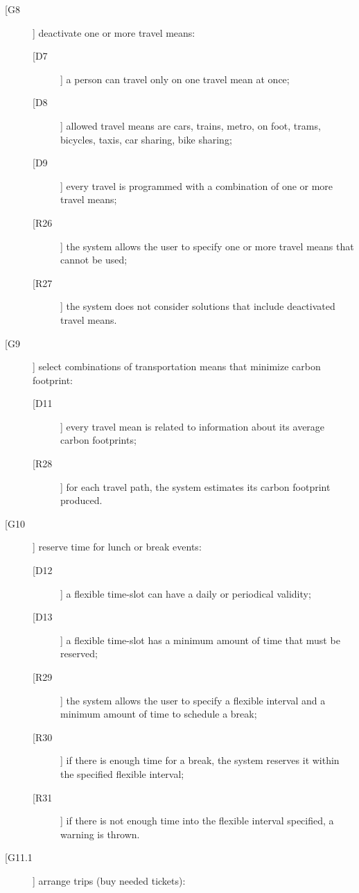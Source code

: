 \begin{description}
\begin{description}
	\end{description}
\item[[G8]] deactivate one or more travel means:
	\begin{description}
	\item[[D7]] a person can travel only on one travel mean at once; 
	\item[[D8]] allowed travel means are cars, trains, metro, on foot, trams, bicycles, taxis, car sharing, bike sharing;	
	\item[[D9]] every travel is programmed with a combination of one or more travel means;
	\newline
	\item[[R26]] the system allows the user to specify one or more travel means that cannot be used;
	\item[[R27]] the system does not consider solutions that include deactivated travel means.
	\end{description}
\item[[G9]] select combinations of transportation means that minimize carbon footprint:
	\begin{description}
	\item[[D11]] every travel mean is related to information about its average carbon footprints;
	\newline
	\item[[R28]] for each travel path, the system estimates its carbon footprint produced.
	\end{description}
\item[[G10]] reserve time for lunch or break events:
	\begin{description}
	\item[[D12]] a flexible time-slot can have a daily or periodical validity;
	\item[[D13]] a flexible time-slot has a minimum amount of time that must be reserved;
	\newline
	\item[[R29]] the system allows the user to specify a flexible interval and a minimum amount of time to schedule a break;
	\item[[R30]] if there is enough time for a break, the system reserves it within the specified flexible interval;
	\item[[R31]] if there is not enough time into the flexible interval specified, a warning is thrown.
	\end{description}
\item[[G11.1]] arrange trips (buy needed tickets):
	\begin{description}

\end{description}
\end{description}
